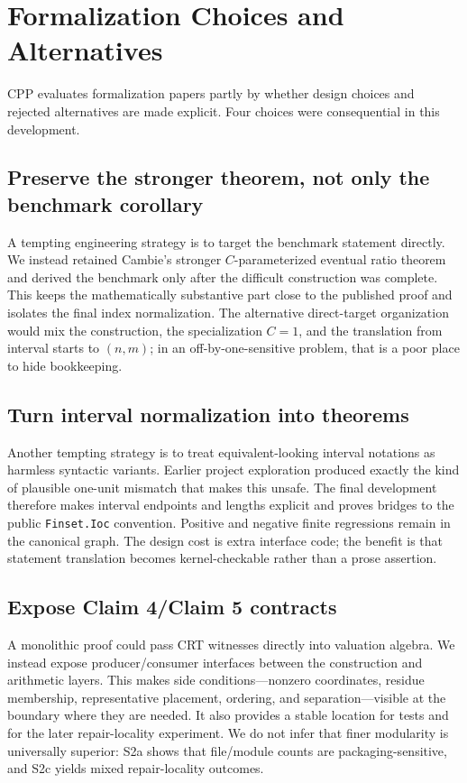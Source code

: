 \documentclass[sigplan,10pt,anonymous,review]{acmart}
\newcommand{\code}[1]{\texttt{#1}}
\begin{document}
\section{Formalization Choices and Alternatives}
CPP evaluates formalization papers partly by whether design choices and rejected alternatives are made explicit. Four choices were consequential in this development.

\subsection{Preserve the stronger theorem, not only the benchmark corollary}
A tempting engineering strategy is to target the benchmark statement directly. We instead retained Cambie's stronger $C$-parameterized eventual ratio theorem and derived the benchmark only after the difficult construction was complete. This keeps the mathematically substantive part close to the published proof and isolates the final index normalization. The alternative direct-target organization would mix the construction, the specialization $C=1$, and the translation from interval starts to $(n,m)$; in an off-by-one-sensitive problem, that is a poor place to hide bookkeeping.

\subsection{Turn interval normalization into theorems}
Another tempting strategy is to treat equivalent-looking interval notations as harmless syntactic variants. Earlier project exploration produced exactly the kind of plausible one-unit mismatch that makes this unsafe. The final development therefore makes interval endpoints and lengths explicit and proves bridges to the public \code{Finset.Ioc} convention. Positive and negative finite regressions remain in the canonical graph. The design cost is extra interface code; the benefit is that statement translation becomes kernel-checkable rather than a prose assertion.

\subsection{Expose Claim 4/Claim 5 contracts}
A monolithic proof could pass CRT witnesses directly into valuation algebra. We instead expose producer/consumer interfaces between the construction and arithmetic layers. This makes side conditions---nonzero coordinates, residue membership, representative placement, ordering, and separation---visible at the boundary where they are needed. It also provides a stable location for tests and for the later repair-locality experiment. We do not infer that finer modularity is universally superior: S2a shows that file/module counts are packaging-sensitive, and S2c yields mixed repair-locality outcomes.
\end{document}
